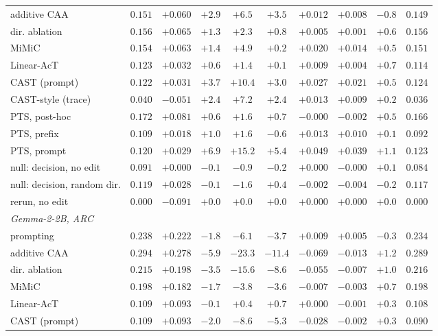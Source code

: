 \begin{table}[h]
{\begin{tabular}{l|cc|ccc|cc|cc}
additive CAA & $0.151$ & $+0.060$ & $+2.9$ & $+6.5$ & $+3.5$ & $+0.012$ & $+0.008$ & $-0.8$ & $0.149$ \\
dir. ablation & $0.156$ & $+0.065$ & $+1.3$ & $+2.3$ & $+0.8$ & $+0.005$ & $+0.001$ & $+0.6$ & $0.156$ \\
MiMiC & $0.154$ & $+0.063$ & $+1.4$ & $+4.9$ & $+0.2$ & $+0.020$ & $+0.014$ & $+0.5$ & $0.151$ \\
Linear-AcT & $0.123$ & $+0.032$ & $+0.6$ & $+1.4$ & $+0.1$ & $+0.009$ & $+0.004$ & $+0.7$ & $0.114$ \\
CAST (prompt) & $0.122$ & $+0.031$ & $+3.7$ & $+10.4$ & $+3.0$ & $+0.027$ & $+0.021$ & $+0.5$ & $0.124$ \\
CAST-style (trace) & $0.040$ & $-0.051$ & $+2.4$ & $+7.2$ & $+2.4$ & $+0.013$ & $+0.009$ & $+0.2$ & $0.036$ \\
PTS, post-hoc & $0.172$ & $+0.081$ & $+0.6$ & $+1.6$ & $+0.7$ & $-0.000$ & $-0.002$ & $+0.5$ & $0.166$ \\
PTS, prefix & $0.109$ & $+0.018$ & $+1.0$ & $+1.6$ & $-0.6$ & $+0.013$ & $+0.010$ & $+0.1$ & $0.092$ \\
PTS, prompt & $0.120$ & $+0.029$ & $+6.9$ & $+15.2$ & $+5.4$ & $+0.049$ & $+0.039$ & $+1.1$ & $0.123$ \\
null: decision, no edit & $0.091$ & $+0.000$ & $-0.1$ & $-0.9$ & $-0.2$ & $+0.000$ & $-0.000$ & $+0.1$ & $0.084$ \\
null: decision, random dir. & $0.119$ & $+0.028$ & $-0.1$ & $-1.6$ & $+0.4$ & $-0.002$ & $-0.004$ & $-0.2$ & $0.117$ \\
rerun, no edit & $0.000$ & $-0.091$ & $+0.0$ & $+0.0$ & $+0.0$ & $+0.000$ & $+0.000$ & $+0.0$ & $0.000$ \\
\hline
\multicolumn{10}{l}{\textit{Gemma-2-2B, ARC}} \\
prompting & $0.238$ & $+0.222$ & $-1.8$ & $-6.1$ & $-3.7$ & $+0.009$ & $+0.005$ & $-0.3$ & $0.234$ \\
additive CAA & $0.294$ & $+0.278$ & $-5.9$ & $-23.3$ & $-11.4$ & $-0.069$ & $-0.013$ & $+1.2$ & $0.289$ \\
dir. ablation & $0.215$ & $+0.198$ & $-3.5$ & $-15.6$ & $-8.6$ & $-0.055$ & $-0.007$ & $+1.0$ & $0.216$ \\
MiMiC & $0.198$ & $+0.182$ & $-1.7$ & $-3.8$ & $-3.6$ & $-0.007$ & $-0.003$ & $+0.7$ & $0.198$ \\
Linear-AcT & $0.109$ & $+0.093$ & $-0.1$ & $+0.4$ & $+0.7$ & $+0.000$ & $-0.001$ & $+0.3$ & $0.108$ \\
CAST (prompt) & $0.109$ & $+0.093$ & $-2.0$ & $-8.6$ & $-5.3$ & $-0.028$ & $-0.002$ & $+0.3$ & $0.090$ \\

\end{tabular}}
\end{table}
